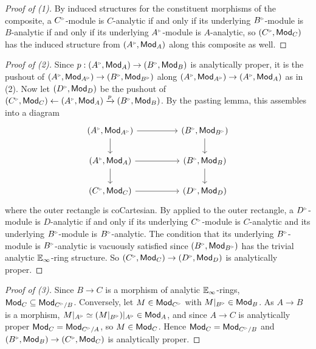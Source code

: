 \begin{proof}[Proof of (1)]
    By induced structures for the constituent morphisms of the composite, a $C^{\tri}$-module is $C$-analytic if and only if its underlying $B^{\tri}$-module is $B$-analytic if and only if its underlying $A^{\tri}$-module is $A$-analytic, so $(C^{\tri},\Mod_{C})$ has the induced structure from $(A^{\tri},\Mod_{A})$ along this composite as well. 
\end{proof}
\begin{proof}[Proof of (2)]
    Since $p:(A^{\tri},\Mod_{A})\to (B^{\tri},\Mod_{B})$ is analytically proper, it is the pushout of $(A^{\tri},\Mod_{A^{\tri}})\to(B^{\tri},\Mod_{B^{\tri}})$ along $(A^{\tri},\Mod_{A^{\tri}})\to(A^{\tri},\Mod_{A})$ as in  (2). Now let $(D^{\tri},\Mod_{D})$ be the pushout of $(C^{\tri},\Mod_{C})\leftarrow(A^{\tri},\Mod_{A})\xrightarrow{p}(B^{\tri},\Mod_{B})$. By the pasting lemma, this assembles into a diagram 
    $$%
    \begin{tikzcd}
        {(A^{\tri},\Mod_{A^{\tri}})} && {(B^{\tri},\Mod_{B^{\tri}})} \\
        {(A^{\tri},\Mod_{A})} && {(B^{\tri},\Mod_{B})} \\
        {(C^{\tri},\Mod_{C})} && {(D^{\tri},\Mod_{D})}
        \arrow[from=1-1, to=1-3]
        \arrow[from=1-1, to=2-1]
        \arrow[from=1-3, to=2-3]
        \arrow[from=2-1, to=2-3]
        \arrow[from=2-1, to=3-1]
        \arrow[from=2-3, to=3-3]
        \arrow[from=3-1, to=3-3]
    \end{tikzcd}$$
    where the outer rectangle is coCartesian. By  applied to the outer rectangle, a $D^{\tri}$-module is $D$-analytic if and only if its underlying $C^{\tri}$-module is $C$-analytic and its underlying $B^{\tri}$-module is $B^{\tri}$-analytic. The condition that its underlying $B^{\tri}$-module is $B^{\tri}$-analytic is vacuously satisfied since $(B^{\tri},\Mod_{B^{\tri}})$ has the trivial analytic $\mathbb{E}_{\infty}$-ring structure. So $(C^{\tri},\Mod_{C})\to(D^{\tri},\Mod_{D})$ is analytically proper. 
\end{proof}
\begin{proof}[Proof of (3)]
    Since $B\to C$ is a morphism of analytic $\mathbb{E}_{\infty}$-rings, $\Mod_{C}\subseteq\Mod_{C^{\tri}/B}$. Conversely, let $M\in\Mod_{C^{\tri}}$ with $M|_{B^{\tri}}\in\Mod_{B}$. As $A\to B$ is a morphism, $M|_{A^{\tri}}\simeq(M|_{B^{\tri}})|_{A^{\tri}}\in\Mod_{A}$, and since $A\to C$ is analytically proper $\Mod_{C}=\Mod_{C^{\tri}/A}$, so $M\in\mathsf{Mod}_{C}$. Hence $\Mod_{C}=\Mod_{C^{\tri}/B}$ and $(B^{\tri},\Mod_{B})\to(C^{\tri},\Mod_{C})$ is analytically proper.
\end{proof}
